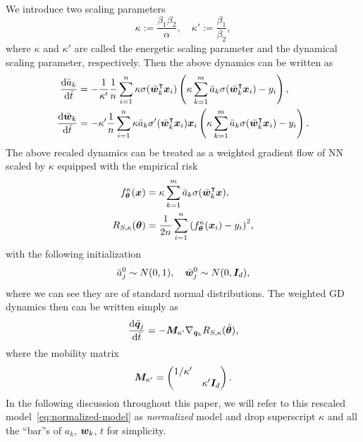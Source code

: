 \documentclass[twoside,11pt]{article}
\begin{document}
We introduce two scaling parameters
\begin{equation}
    \kappa := \frac{\beta_1\beta_2}{\alpha}, \quad \kappa' :=\frac{\beta_1}{\beta_2},
\end{equation}
where $\kappa$ and $\kappa'$ are called the energetic scaling parameter and the dynamical scaling parameter, respectively. Then the above dynamics can be written as
\begin{align*}
    \frac{\mathrm{d} \bar{a}_k}{\mathrm{d} \bar{t}}
     & = -\frac{1}{\kappa'}\frac{1}{n}\sum_{i=1}^n \kappa\sigma(\bar{\bm{w}}_k^\intercal\bm{x}_i) \left(\kappa\sum_{k=1}^{m}\bar{a}_k\sigma(\bar{\bm{w}}_k^\intercal\bm{x}_i)-y_i\right),      \\
    \frac{\mathrm{d} \bar{\bm{w}}_k}{\mathrm{d} \bar{t}}
     & = -\kappa'\frac{1}{n}\sum_{i=1}^n\kappa \bar{a}_k\sigma'(\bar{\bm{w}}_k^\intercal\bm{x}_i)\bm{x}_i \left(\kappa\sum_{k=1}^{m}\bar{a}_k\sigma(\bar{\bm{w}}_k^\intercal\bm{x}_i)-y_i\right).
\end{align*}
The above recaled dynamics can be treated as a weighted gradient flow of NN scaled by $\kappa$ equipped with the empirical risk
\begin{align}\label{eq:normalized-model}
    f^{\kappa}_{\bm{\theta}}(\bm{x})
     & = \kappa\sum_{k=1}^{m}\bar{a}_k\sigma(\bar{\bm{w}}_k^\intercal\bm{x}),       \\
    R_{S, \kappa}(\bm{\theta})
     & =\frac{1}{2n}\sum_{i=1}^n{(f^{\kappa}_{\bm{\theta}}(\bm{x}_i)-y_i)}^2,
\end{align}
with the following initialization
\begin{equation}
    \bar{a}_j^0\sim N(0,1), \quad \bar{\bm{w}}_j^0\sim N(0,\bm{I}_d),
\end{equation}
where we can see they are of standard normal distributions. The weighted GD dynamics then can be written simply as
\begin{equation} \label{eq:qdynamics}
    \frac{\mathrm{d}\bar{\bm{q}}_j}{\mathrm{d} \bar{t}} = -\bm{M}_{\kappa'}\nabla_{\bm{q}_k}R_{S,\kappa}(\bar{\bm{\theta}}),
\end{equation}
where the mobility matrix
\begin{equation}
    \bm{M}_{\kappa'} =
    \begin{pmatrix}
        1/\kappa' &              \\
                  & \kappa'\bm{I}_d
    \end{pmatrix}.
\end{equation}
In the following discussion throughout this paper, we will refer to this rescaled model~\eqref{eq:normalized-model} as \emph{normalized} model and drop superscript $\kappa$ and all the ``bar''s of $a_k$, $\bm{w}_k$, $t$ for simplicity.
\end{document}
